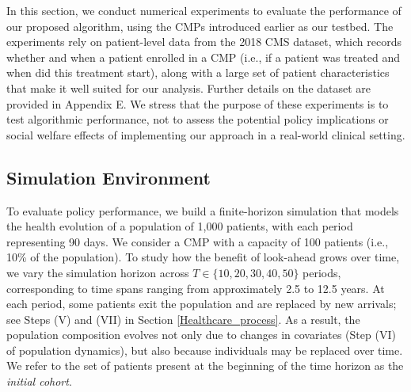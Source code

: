 \documentclass[12pt,a4paper]{article}
\begin{document}
In this section, we conduct numerical experiments to evaluate the performance of our proposed algorithm, using the CMPs introduced earlier as our testbed. The experiments rely on patient-level data from the 2018 CMS dataset, which records whether and when a patient enrolled in a CMP (i.e., if a patient was treated and when did this treatment start), along with a large set of patient characteristics that make it well suited for our analysis. Further details on the dataset are provided in Appendix E. We stress that the purpose of these experiments is to test algorithmic performance, not to assess the potential policy implications or social welfare effects of implementing our approach in a real-world clinical setting. 


\subsection{Simulation Environment}


To evaluate policy performance, 
we build a finite-horizon simulation that models the health evolution of a population of 1,000 patients, with each period representing 90 days. 
We consider a CMP with a capacity of 100 patients (i.e., 10\% of the population).
To study how the benefit of look-ahead grows over time, we vary the simulation horizon across $T \in \{10, 20, 30, 40, 50\}$ periods, corresponding to time spans ranging from approximately 2.5 to 12.5 years.
At each period, some patients exit the population and are replaced by new arrivals; see Steps (V) and (VII) in Section \ref{Healthcare_process}. As a result, the population composition evolves not only due to changes in covariates (Step (VI) of population dynamics), but also because individuals may be replaced over time. We refer to the set of patients present at the beginning of the time horizon as the {\it initial cohort}. 
\end{document}
